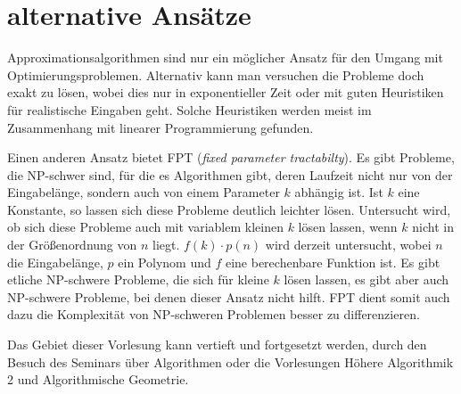 \section{alternative Ansätze}
Approximationsalgorithmen sind nur ein möglicher Ansatz für den Umgang mit Optimierungsproblemen. Alternativ kann man versuchen die Probleme doch exakt zu lösen, wobei dies nur in exponentieller Zeit oder mit guten Heuristiken für realistische Eingaben geht. Solche Heuristiken werden meist im Zusammenhang mit linearer Programmierung gefunden.

Einen anderen Ansatz bietet FPT (\textit{fixed parameter tractabilty}). Es gibt Probleme, die \textsf{NP}-schwer sind, für die es Algorithmen gibt, deren Laufzeit nicht nur von der Eingabelänge, sondern auch von einem Parameter $k$ abhängig ist. Ist $k$ eine Konstante, so lassen sich diese Probleme deutlich leichter lösen. Untersucht wird, ob sich diese Probleme auch mit variablem kleinen $k$ lösen lassen, wenn $k$ nicht in der Größenordnung von $n$ liegt. $f(k) \cdot p(n)$ wird derzeit untersucht, wobei $n$ die Eingabelänge, $p$ ein Polynom und $f$ eine berechenbare Funktion ist. Es gibt etliche \textsf{NP}-schwere Probleme, die sich für kleine $k$ lösen lassen, es gibt aber auch \textsf{NP}-schwere Probleme, bei denen dieser Ansatz nicht hilft. FPT dient somit auch dazu die Komplexität von \textsf{NP}-schweren Problemen besser zu differenzieren.

Das Gebiet dieser Vorlesung kann vertieft und fortgesetzt werden, durch den Besuch des Seminars über Algorithmen oder die Vorlesungen Höhere Algorithmik 2 und Algorithmische Geometrie.

